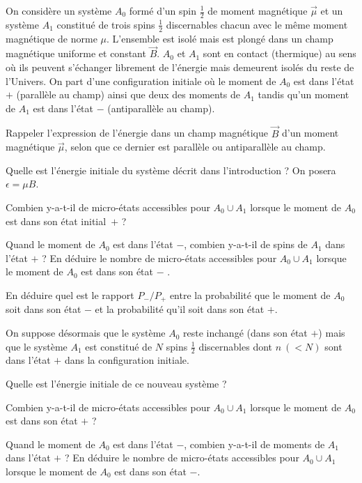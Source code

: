 On considère un système $A_0$ formé d'un spin $\frac{1}{2}$ de moment magnétique $\Vec{\mu}$ et un système $A_1$ constitué de trois spins $\frac{1}{2}$  discernables chacun avec le même moment magnétique de norme $\mu$. L'ensemble est isolé mais est plongé dans un champ magnétique uniforme et constant $\vec B$. $A_0$ et $A_1$ sont en contact (thermique) au sens où ils peuvent s'échanger librement de l'énergie mais demeurent isolés du reste de l'Univers. On part d'une configuration initiale où le moment de $A_0$ est dans l'état $+$ (parallèle au champ) ainsi que  deux des moments
de $A_1$ tandis qu'un moment de $A_1$ est dans l'état $-$ (antiparallèle au champ).

\medskip

\question Rappeler l'expression de l'énergie dans un champ magnétique $\vec B$ d'un moment magnétique $\Vec{\mu}$,  selon que ce dernier est parallèle ou antiparallèle au champ.

\question Quelle est l'énergie initiale du système décrit dans l'introduction ? On posera $\epsilon=\mu B$.

\question Combien y-a-t-il de micro-états accessibles pour $A_0 \cup A_1$ lorsque le moment de $A_0$ est dans son état \mbox{initial $+$} ? 

\question Quand le moment de $A_0$ est dans l'état $-$, combien y-a-t-il de spins de $A_1$ dans l'état $+$ ? En déduire le nombre de micro-états accessibles pour $A_0 \cup A_1$ lorsque le moment de $A_0$ est dans son état $-$ .

\question En déduire quel est le rapport $P_-/P_+$ entre la probabilité que le moment de $A_0$ soit dans son état $-$ et la probabilité qu'il soit dans son état $+$.

\medskip

On suppose désormais que le  système $A_0$ reste inchangé (dans son état $+$) mais que le système $A_1$ est constitué de $N$ spins $\frac{1}{2}$ discernables dont $n \ (< N)$ sont dans l'état $+$ dans la configuration initiale.

\medskip

\question Quelle est l'énergie initiale de ce nouveau système ?

\question Combien y-a-t-il de micro-états accessibles pour $A_0 \cup A_1$ lorsque le moment de $A_0$ est dans son état $+$ ? 

\question Quand le moment de $A_0$ est dans l'état $-$, combien y-a-t-il de moments de $A_1$ dans l'état $+$ ? En déduire le nombre de micro-états accessibles pour $A_0 \cup A_1$ lorsque le moment de $A_0$ est dans son état $-$.

